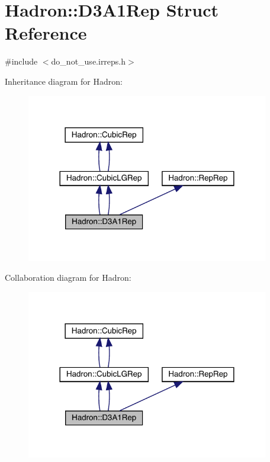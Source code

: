 \hypertarget{structHadron_1_1D3A1Rep}{}\section{Hadron\+:\+:D3\+A1\+Rep Struct Reference}
\label{structHadron_1_1D3A1Rep}


{\ttfamily \#include $<$do\+\_\+not\+\_\+use.\+irreps.\+h$>$}



Inheritance diagram for Hadron\+:\nopagebreak
\begin{figure}[H]
\begin{center}
\leavevmode
\includegraphics[width=300pt]{d7/d78/structHadron_1_1D3A1Rep__inherit__graph}
\end{center}
\end{figure}


Collaboration diagram for Hadron\+:\nopagebreak
\begin{figure}[H]
\begin{center}
\leavevmode
\includegraphics[width=300pt]{de/d31/structHadron_1_1D3A1Rep__coll__graph}
\end{center}
\end{figure}
